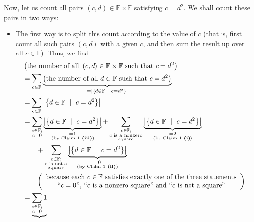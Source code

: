 \documentclass[paper=a4, fontsize=12pt]{scrartcl}%
\let\sumnonlimits\sum
\renewcommand{\sum}{\sumnonlimits\limits}
\theoremstyle{plainsl}
\theoremstyle{definition}
\theoremstyle{remark}
\begin{document}
Now, let us count all pairs $\left(  c,d\right)  \in\mathbb{F}\times
\mathbb{F}$ satisfying $c=d^{2}$. We shall count these pairs in two ways:

\begin{itemize}
\item The first way is to split this count according to the value of $c$ (that
is, first count all such pairs $\left(  c,d\right)  $ with a given $c$, and
then sum the result up over all $c\in\mathbb{F}$). Thus, we find%
\begin{align*}
&  \left(  \text{the number of all }\left(  c,d\right)  \in\mathbb{F}%
\times\mathbb{F}\text{ such that }c=d^{2}\right) \\
&  =\sum_{c\in\mathbb{F}}\underbrace{\left(  \text{the number of all }%
d\in\mathbb{F}\text{ such that }c=d^{2}\right)  }_{=\left\vert \left\{
d\in\mathbb{F}\ \mid\ c=d^{2}\right\}  \right\vert }\\
&  =\sum_{c\in\mathbb{F}}\left\vert \left\{  d\in\mathbb{F}\ \mid
\ c=d^{2}\right\}  \right\vert \\
&  =\sum_{\substack{c\in\mathbb{F};\\c=0}}\underbrace{\left\vert \left\{
d\in\mathbb{F}\ \mid\ c=d^{2}\right\}  \right\vert }_{\substack{=1\\\text{(by
Claim 1 \textbf{(iii)})}}}+\sum_{\substack{c\in\mathbb{F};\\c\text{ is a
nonzero}\\\text{square}}}\underbrace{\left\vert \left\{  d\in\mathbb{F}%
\ \mid\ c=d^{2}\right\}  \right\vert }_{\substack{=2\\\text{(by Claim 1
\textbf{(i)})}}}\\
&  \qquad+\sum_{\substack{c\in\mathbb{F};\\c\text{ is not a}\\\text{square}%
}}\underbrace{\left\vert \left\{  d\in\mathbb{F}\ \mid\ c=d^{2}\right\}
\right\vert }_{\substack{=0\\\text{(by Claim 1 \textbf{(ii)})}}}\\
&  \qquad\left(
\begin{array}
[c]{c}%
\text{because each }c\in\mathbb{F}\text{ satisfies exactly one of the three
statements}\\
\text{\textquotedblleft}c=0\text{\textquotedblright, \textquotedblleft}c\text{
is a nonzero square\textquotedblright\ and \textquotedblleft}c\text{ is not a
square\textquotedblright}%
\end{array}
\right) \\
&  =\underbrace{\sum_{\substack{c\in\mathbb{F};\\c=0}}1}%

\end{align*}
\end{itemize}
\end{document}
